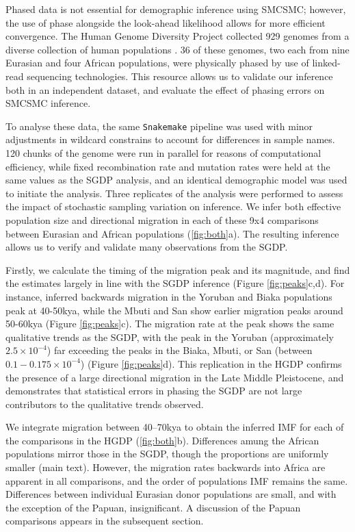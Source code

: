 Phased data is not essential for demographic inference using SMCSMC; however, the use of phase alongside the look-ahead likelihood allows for more efficient convergence. The Human Genome Diversity Project collected 929 genomes from a diverse collection of human populations \cite{Bergstrom2019}. 36 of these genomes, two each from nine Eurasian and four African populations, were physically phased by use of linked-read sequencing technologies. This resource allows us to validate our inference both in an independent dataset, and evaluate the effect of phasing errors on SMCSMC inference.   

To analyse these data, the same {\tt Snakemake} pipeline was used with minor adjustments in wildcard constrains to account for differences in sample names. 120 chunks of the genome were run in parallel for reasons of computational efficiency, while fixed recombination rate and mutation rates were held at the same values as the SGDP analysis, and an identical demographic model was used to initiate the analysis. Three replicates of the analysis were performed to assess the impact of stochastic sampling variation on inference. We infer both effective population size and directional migration in each of these 9x4 comparisons between Eurasian and African populations (\autoref{fig:both}a). The resulting inference allows us to verify and validate many observations from the SGDP.

Firstly, we calculate the timing of the migration peak and its magnitude, and find the estimates largely in line with the SGDP inference (Figure \ref{fig:peaks}c,d). For instance, inferred backwards migration in the Yoruban and Biaka populations peak at 40-50kya, while the Mbuti and San show earlier migration peaks around 50-60kya (Figure \autoref{fig:peaks}c). The migration rate at the peak shows the same qualitative trends as the SGDP, with the peak in the Yoruban (approximately $2.5\times10^{-4}$) far exceeding the peaks in the Biaka, Mbuti, or San (between $0.1-0.175\times10^{-4}$) (Figure \autoref{fig:peaks}d). This replication in the HGDP confirms the presence of a large directional migration in the Late Middle Pleistocene, and demonstrates that statistical errors in phasing the SGDP are not large contributors to the qualitative trends observed. 

We integrate migration between 40--70kya to obtain the inferred IMF for each of the comparisons in the HGDP (\autoref{fig:both}b). Differences amung the African populations mirror those in the SGDP, though the proportions are uniformly smaller (main text). However, the migration rates backwards into Africa are apparent in all comparisons, and the order of populations IMF remains the same. Differences between individual Eurasian donor populations are small, and with the exception of the Papuan, insignificant. A discussion of the Papuan comparisons appears in the subsequent section.  

